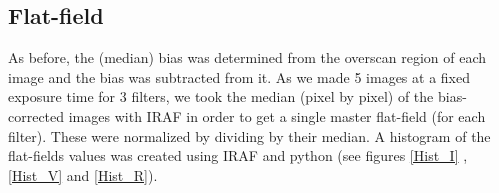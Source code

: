 \documentclass[12pt]{article}
\begin{document}
\subsection{Flat-field}
	As before, the (median) bias was determined from the overscan region of each image and the bias was subtracted from it. As we made 5 images at a fixed exposure time for 3 filters, we took the median (pixel by pixel) of the bias-corrected images with IRAF in order to get a single master flat-field (for each filter). These were normalized by dividing by their median. A histogram of the flat-fields values was created using IRAF and python (see figures \ref{Hist_I} , \ref{Hist_V} and \ref{Hist_R}). 
\end{document}
